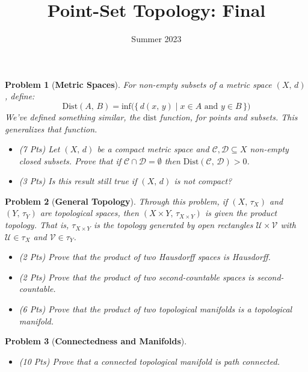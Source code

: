 \documentclass{article}
\title{Point-Set Topology: Final}
\date{Summer 2023}
\theoremstyle{normal}
\newtheorem{problem}{Problem}
\begin{document}
    \maketitle
    \begin{problem}[\textbf{Metric Spaces}]
        For non-empty subsets of a metric space $(X,\,d)$, define:
        \begin{equation}
            \textrm{Dist}(A,\,B)
            =\textrm{inf}\big(
                \{\,d(x,\,y)\;|\;x\in{A}\textrm{ and }y\in{B}\,\}
            \big)
        \end{equation}
        We've defined something similar, the $\textrm{dist}$ function,
        for points and subsets. This generalizes that function.
        \begin{itemize}
            \item (7 Pts) Let $(X,\,d)$ be a compact metric space and
                $\mathcal{C},\mathcal{D}\subseteq{X}$ non-empty closed
                subsets. Prove that if
                $\mathcal{C}\cap\mathcal{D}=\emptyset$ then
                $\textrm{Dist}(\mathcal{C},\,\mathcal{D})>0$.
            \item (3 Pts) Is this result still true if $(X,\,d)$ is not
                compact?
        \end{itemize}
    \end{problem}
    \begin{problem}[\textbf{General Topology}]
        Through this problem, if $(X,\,\tau_{X})$ and $(Y,\,\tau_{Y})$ are
        topological spaces, then $(X\times{Y},\,\tau_{X\times{Y}})$ is given
        the product topology. That is, $\tau_{X\times{Y}}$ is the
        topology generated by open rectangles $\mathcal{U}\times\mathcal{V}$
        with $\mathcal{U}\in\tau_{X}$ and $\mathcal{V}\in\tau_{Y}$.
        \begin{itemize}
            \item (2 Pts) Prove that the product of two Hausdorff
                spaces is Hausdorff.
            \item (2 Pts) Prove that the product of two second-countable spaces
                is second-countable.
            \item (6 Pts) Prove that the product of two topological manifolds
                is a topological manifold.
        \end{itemize}
    \end{problem}
    \begin{problem}[\textbf{Connectedness and Manifolds}]
        \par\hfill\par
        \begin{itemize}
            \item (10 Pts) Prove that a connected topological manifold is
                path connected.
        \end{itemize}
    \end{problem}
\end{document}
